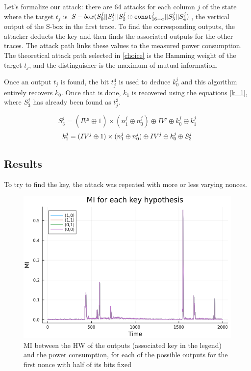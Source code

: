 \documentclass[11pt,technote]{IEEEtran}
\begin{document}
		Let's formalize our attack: there are 64 attacks for each column $j$ of the state where the target $t_j$ is $S-box(S_0^j||S_1^j||S_2^j \oplus \verb|const|_{16-a}^j||S_3^j||S_4^j)$, the vertical output of the S-box in the first trace. To find the corresponding outputs, the attacker deducts the key and then finds the associated outputs for the other traces. The attack path links these values to the measured power consumption. The theoretical attack path selected in \ref{choice} is the Hamming weight of the target $t_j$, and the distinguisher is the maximum of mutual information.
		
		Once an output $t_j$ is found, the bit $t_j^4$ is used to deduce $k_0^j$ and this algorithm entirely recovers $k_0$. Once that is done, $k_1$ is recovered using the equations \ref{k_1}, where $S_3^j$ has already been found as $t_j^3$.
		
		\begin{equation} 
			S_3^j = (IV^j \oplus 1) \times (n_1^j \oplus n_0^j) \oplus IV^j \oplus k_0^j \oplus k_1^j
		\end{equation}
		\begin{equation} \label{k_1}
			k_1^j = (IV^j \oplus 1) \times (n_1^j \oplus n_0^j) \oplus IV^j \oplus k_0^j \oplus S_3^j\\
		\end{equation}
		
		\subsection{Results}
		To try to find the key, the attack was repeated with more or less varying nonces.
		
		\begin{figure}[h]
			\centering
			\includegraphics[scale=0.4]{img_files/nonces_half_fixed}
			\caption{MI between the HW of the outputs (associated key in the legend) and the power consumption, for each of the possible outputs for the first nonce with half of its bits fixed}
			\label{half_fixed}
		\end{figure}
		
\end{document}
